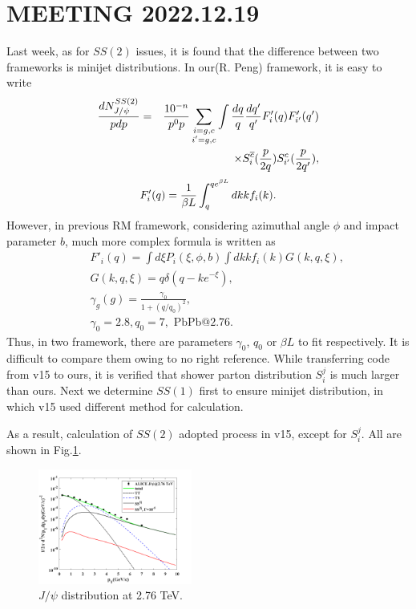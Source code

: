 \documentclass[twocolumn,aps,superscriptaddress,nofootinbib,floatfix]{revtex4}
\begin{document}
\section{MEETING 2022.12.19}
Last week, as for $SS(2)$ issues, it is found that the difference between two frameworks is minijet distributions. In our(R. Peng) framework, it is easy to write
\begin{eqnarray}
	\frac{dN^{SS(2)}_{J/\psi}}{pdp}&=&\frac{10^{-n}}{p^0p}\sum_{\substack{i=g,c\\ i'=g,c}} \int \frac{dq}{q}\frac{dq'}{q'}F'_i(q)F'_{i'}(q')\nonumber \\
	&&\times  S_i^{\overline c}({p\over 2q})   S_{i'}^c({p\over 2q'}),
\end{eqnarray}
\begin{eqnarray}
	F'_i(q)={1\over \beta L}\int_{q}^{q e^{\beta L}} dkk f_i(k).
\end{eqnarray}
However, in previous RM framework\cite{Zhu_2020}, considering azimuthal angle $\phi$ and impact parameter $b$, much more complex formula is written as
\begin{eqnarray}
	&&F'_i(q)=\int d\xi P_i(\xi,\phi,b) \int dkk f_i(k)G(k,q,\xi),\\
	&&G(k,q,\xi)=q\delta(q-ke^{-\xi}),\\
	&&\gamma_g(g)=\frac{\gamma_0}{1+(q/q_0)^2},\\
	&&\gamma_0=2.8,q_0=7,\text{  PbPb@2.76}.
\end{eqnarray}
Thus, in two framework, there are parameters $\gamma_0$, $q_0$ or $\beta L$ to fit respectively. It is difficult to compare them owing to no right reference. While transferring code from v15 to ours, it is verified that shower parton distribution $S_i^j$ is much larger than ours. Next we determine $SS(1)$ first to ensure minijet distribution, in which v15 used different method for calculation.

As a result, calculation of $SS(2)$ adopted process in v15, except for $S_i^j$. All are shown in Fig.\ref{fig36}. 

\begin{figure}[H]
	\includegraphics[width=0.45\textwidth]{Jpsi276_221218.png}
	\caption{$J/\psi$ distribution at 2.76 TeV. }
	\label{fig36}
\end{figure}
\end{document}
